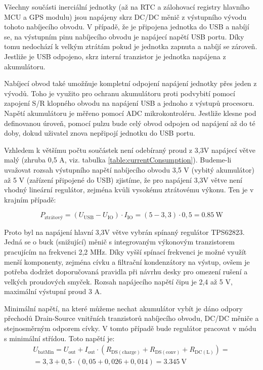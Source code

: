 Všechny součásti inerciální jednotky (až na \ac{RTC} a zálohovací registry hlavního \ac{MCU} a \ac{GPS} modulu) jsou napájeny skrz DC/DC měnič z výstupního vývodu tohoto nabíjecího obvodu. V případě, že je připojena jednotka do \ac{USB} a nabíjí se, na výstupním pinu nabíjecího obvodu je napájecí napětí USB portu. Díky tomu nedochází k velkým ztrátám pokud je jednotka zapnuta a nabíjí se zároveň. Jestliže je \ac{USB} odpojeno, skrz interní tranzistor je jednotka napájena z akumulátoru. \cite{F5eZCtr2LLRsr9NT}

Nabíjecí obvod také umožňuje kompletní odpojení napájení jednotky přes jeden z vývodů. Toho je využito pro ochranu akumulátoru proti podvybití pomocí zapojení S/R klopného obvodu na napájení \ac{USB} a jednoho z výstupů procesoru. Napětí akumulátoru je měřeno pomocí \ac{ADC} mikrokontroléru. Jestliže klesne pod definovanou úroveň, pomocí pulzu bude celý obvod odpojen od napájení až do té doby, dokud uživatel znova nepřipojí jednotku do \ac{USB} portu.



Vzhledem k většímu počtu součástek není odebíraný proud z 3,3V napájecí větve malý (zhruba 0,5 A, viz. tabulka \ref{table:currentConsumption}). Budeme-li uvažovat rozsah výstupního napětí nabíjecího obvodu 3,5 V (vybitý akumulátor) až 5 V (zařízení připojené do \ac{USB}) zjistíme, že pro napájení 3,3V větve není vhodný lineární regulátor, zejména kvůli vysokému ztrátovému výkonu. Ten je v krajním případě:

\begin{equation}
P_{\mathrm{ztrátový}} = (U_{\mathrm{USB}}-U_{\mathrm{IO}})\cdot I_{\mathrm{IO}}=(5-3,3)\cdot 0,5= \SI{0,85}{\watt}
\end{equation}

Proto byl na napájení hlavní 3,3V větve vybrán spínaný regulátor TPS62823. Jedná se o buck (snižující) měnič s integrovaným výkonovým tranzistorem pracujícím na frekvenci 2,2 MHz. Díky vyšší spínací frekvenci je možné využít menší komponenty, zejména cívku a filtrační kondenzátory na výstup, ovšem je potřeba dodržet doporučovaná pravidla při návrhu desky pro omezení rušení a velkých proudových smyček. Rozsah napájecího napětí čipu je 2,4 až 5 V, maximální výstupní proud 3 A. \cite{mGnys3WmOkWuaQHN}

Minimální napětí, na které můžeme nechat akumulátor vybít je dáno odpory přechodů Drain-Source vnitřních tranzistorů nabíjecího obvodu, DC/DC měniče a stejnosměrným odporem cívky. V tomto případě bude regulátor pracovat v módu s minimální střídou. \cite{mGnys3WmOkWuaQHN} Toto napětí je:
\begin{equation}
\begin{matrix}
 U_{\mathrm{batMin}} = U_{\mathrm{out}} + I_{\mathrm{out}} \cdot (R_{\mathrm{DS(charge)}} + R_{\mathrm{DS(conv)}} + R_{\mathrm{DC(L)}})= \\
  =3,3 + 0,5 \cdot (0,05 + 0,026 + 0,014) = \SI{3,345}{\volt}
\end{matrix}
 \end{equation}

